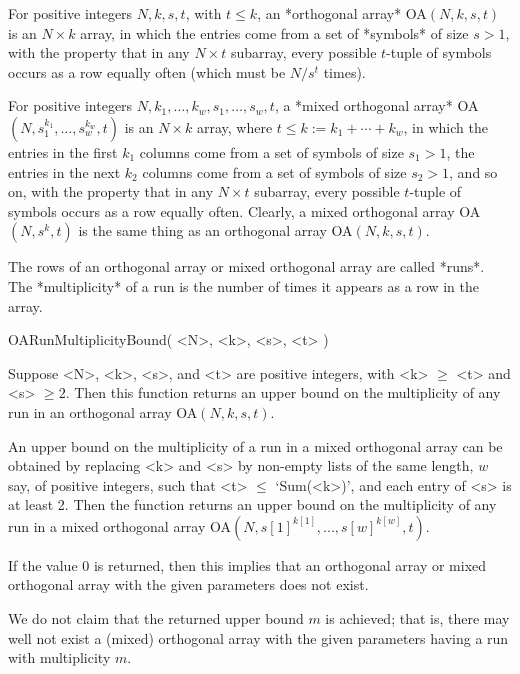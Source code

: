 
For positive integers $N,k,s,t$, with $t\le k$, an *orthogonal array*
OA$(N,k,s,t)$ is an $N\times k$ array, in which the entries come from a
set of *symbols* of size $s>1$, with the property that in any $N\times t$
subarray, every possible $t$-tuple of symbols occurs as a row equally
often (which must be $N/s^t$ times).

For positive integers $N,k_1,\ldots,k_w,s_1,\ldots,s_w,t$, a *mixed
orthogonal array* 
OA$(N,s_1^{k_1},\ldots,s_w^{k_w},t)$ is an $N\times k$
array, where $t\le k:=k_1+\cdots +k_w$, in which the entries in the first
$k_1$ columns come from a set of symbols of size $s_1>1$, the entries
in the next $k_2$ columns come from a set of symbols of size $s_2>1$,
and so on, with the property that in any $N\times t$ subarray, every
possible $t$-tuple of symbols occurs as a row equally often.
Clearly, a mixed orthogonal array OA$(N,s^k,t)$ is the same thing as an
orthogonal array OA$(N,k,s,t)$.  

The rows of an orthogonal array or mixed orthogonal array are called *runs*. 
The *multiplicity* of a run is the number of times it appears as a row
in the array.


\>OARunMultiplicityBound( <N>, <k>, <s>, <t> )

Suppose <N>, <k>, <s>, and <t> are positive integers, with <k> $\ge$ <t> and
<s> $\ge 2$. Then this function returns an upper bound on the multiplicity
of any run in an orthogonal array OA$(N,k,s,t)$. 

An upper bound on the multiplicity of a run in a mixed orthogonal array
can be obtained by replacing <k> and <s> by non-empty lists of the same
length, $w$ say, of positive integers, such that <t> $\le$ `Sum(<k>)',
and each entry of <s> is at least 2.  Then the function returns an
upper bound on the multiplicity of any run in a mixed orthogonal array
OA$(N,s[1]^{k[1]},...,s[w]^{k[w]},t)$.

If the value $0$ is returned, then this implies that an orthogonal array
or mixed orthogonal array with the given parameters does not exist.

We do not claim that the returned upper bound $m$ is achieved; that
is, there may well not exist a (mixed) orthogonal array with the given
parameters having a run with multiplicity $m$.

